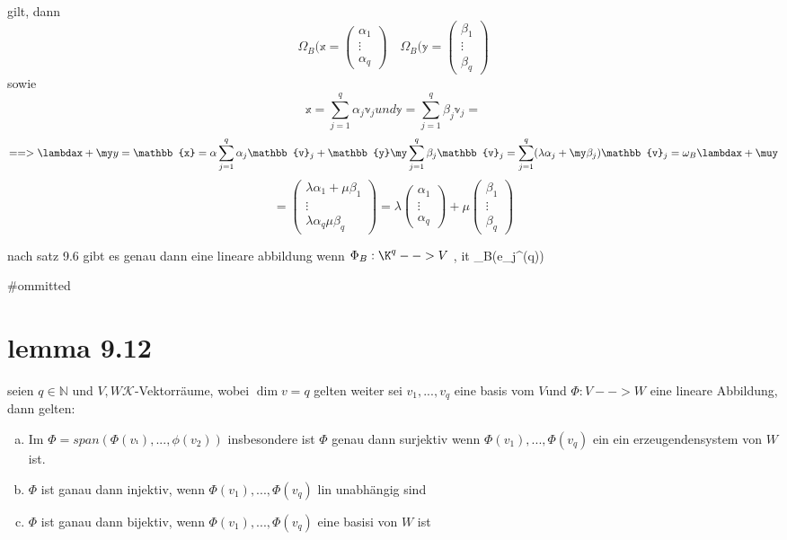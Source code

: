 \documentclass[11pt]{article}
\begin{document}
{\begin{item}
  gilt, dann 
  \[\Omega_B(\mathbb{x}=
  \begin{pmatrix}
  \alpha_1\\ \vdots\\ \alpha_q
 \end{pmatrix}
 \quad
 \Omega_B(\mathbb{y}=
  \begin{pmatrix}
  \beta_1\\ \vdots\\ \beta_q
 \end{pmatrix}\]
 sowie \[\mathbb{x}=\sum_{j=1}^{q}\alpha_j \mathbb{v}_j und \mathbb{y}=\sum_{j=1}^{q}\beta_j \mathbb{v}_j=\] 
 \[==> \lambdax +\my y= \mathbb{x}=\alpha \sum_{j=1}^{q}\alpha_j \mathbb{v}_j + \mathbb{y}\my\sum_{j=1}^{q}\beta_j \mathbb{v}_j
 = \sum_{j=1}^{q}(\lambda\alpha_j+\my\beta_j )\mathbb{v}_j= \omega_B \lambdax+\muy\]
 \[=
 \begin{pmatrix}
  \lambda\alpha_1+\mu \beta_1\\ \vdots\\ \lambda\alpha_q\mu\beta_q
 \end{pmatrix}
 =\lambda\begin{pmatrix}
  \alpha_1\\ \vdots\\ \alpha_q
 \end{pmatrix}
 +\mu\begin{pmatrix}
  \beta_1\\ \vdots\\ \beta_q
 \end{pmatrix}
 \]
\end{item}
nach satz 9.6 gibt es genau dann eine lineare abbildung wenn $\Phi _B : \K^q--> V$ , it 
\phi_B(e_j^(q))

#ommitted

\section{lemma 9.12}
seien $q \in \mathbb{N}$ und $V,W \mathcal{K}$-Vektorräume, wobei $\dim v=q$ gelten weiter sei $v_1,...,v_q$ eine basis vom $V $und $\Phi: V--> W$ eine lineare Abbildung, dann gelten:
\begin{enumerate}[a)]
 \item Im $\Phi = span (\Phi(v_¹),...,\phi(v_2))$ insbesondere ist $\Phi$ genau dann surjektiv wenn $\Phi(v_1) ,..., \Phi(v_q)$ ein ein erzeugendensystem von $W$ ist.
 \item $\Phi$ ist ganau dann injektiv, wenn $\Phi(v_1),..., \Phi(v_q)$ lin unabhängig sind
 \item $\Phi$ ist ganau dann bijektiv, wenn $\Phi(v_1),..., \Phi(v_q)$ eine basisi von $W$ ist
\end{enumerate}

}
\end{document}
